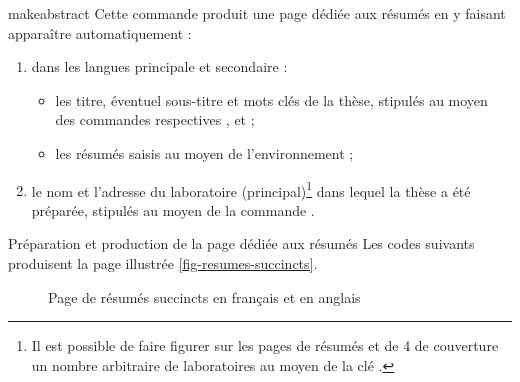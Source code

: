 \begin{docCommand}[doc description=\mandatory]{makeabstract}{}
  Cette commande produit une page dédiée aux résumés en y faisant
  apparaître automatiquement :
  \begin{enumerate}
  \item dans les langues principale et secondaire :
    \begin{itemize}
    \item les titre, éventuel sous-titre et mots clés de la thèse, stipulés au
      moyen des commandes respectives ,  et
       ;
    \item les résumés saisis au moyen de l'environnement  ;
    \end{itemize}
  \item le nom et l'adresse du laboratoire (principal)\footnote{Il est possible
      de faire figurer sur les pages de résumés et de 4\ieme{} de couverture un
      nombre arbitraire de laboratoires au moyen de la clé
      .} dans lequel la thèse a été préparée, stipulés
    au moyen de la commande .
  \end{enumerate}
\end{docCommand}

\begin{dbexample}{Préparation et production de la page dédiée aux résumés}{}
  Les codes suivants produisent la page illustrée \vref{fig-resumes-succincts}.
\begin{bodycode}
\begin{abstract}
  \lipsum[1-2]
\end{abstract}
\begin{abstract}
  \lipsum[3-4]
\end{abstract}
\end{bodycode}
\end{dbexample}

\begin{figure}[htbp]
  \centering
  \caption{Page de résumés succincts en français et en anglais}
  \label{fig-resumes-succincts}
\end{figure}

